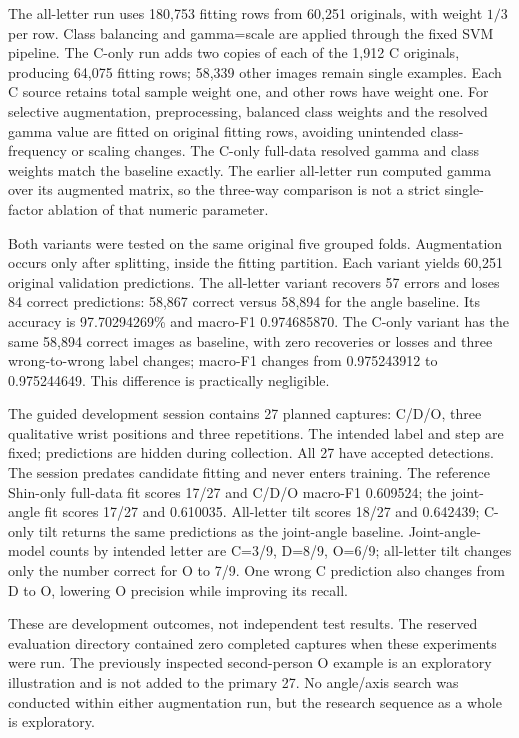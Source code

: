 \documentclass{article}
\begin{document}
The all-letter run uses 180,753 fitting rows from 60,251 originals, with weight $1/3$ per row. Class balancing and gamma=scale are applied through the fixed SVM pipeline. The C-only run adds two copies of each of the 1,912 C originals, producing 64,075 fitting rows; 58,339 other images remain single examples. Each C source retains total sample weight one, and other rows have weight one. For selective augmentation, preprocessing, balanced class weights and the resolved gamma value are fitted on original fitting rows, avoiding unintended class-frequency or scaling changes. The C-only full-data resolved gamma and class weights match the baseline exactly. The earlier all-letter run computed gamma over its augmented matrix, so the three-way comparison is not a strict single-factor ablation of that numeric parameter.

Both variants were tested on the same original five grouped folds. Augmentation occurs only after splitting, inside the fitting partition. Each variant yields 60,251 original validation predictions. The all-letter variant recovers 57 errors and loses 84 correct predictions: 58,867 correct versus 58,894 for the angle baseline. Its accuracy is 97.70294269\% and macro-F1 0.974685870. The C-only variant has the same 58,894 correct images as baseline, with zero recoveries or losses and three wrong-to-wrong label changes; macro-F1 changes from 0.975243912 to 0.975244649. This difference is practically negligible.

The guided development session contains 27 planned captures: C/D/O, three qualitative wrist positions and three repetitions. The intended label and step are fixed; predictions are hidden during collection. All 27 have accepted detections. The session predates candidate fitting and never enters training. The reference Shin-only full-data fit scores 17/27 and C/D/O macro-F1 0.609524; the joint-angle fit scores 17/27 and 0.610035. All-letter tilt scores 18/27 and 0.642439; C-only tilt returns the same predictions as the joint-angle baseline. Joint-angle-model counts by intended letter are C=3/9, D=8/9, O=6/9; all-letter tilt changes only the number correct for O to 7/9. One wrong C prediction also changes from D to O, lowering O precision while improving its recall.

These are development outcomes, not independent test results. The reserved evaluation directory contained zero completed captures when these experiments were run. The previously inspected second-person O example is an exploratory illustration and is not added to the primary 27. No angle/axis search was conducted within either augmentation run, but the research sequence as a whole is exploratory.
\end{document}
